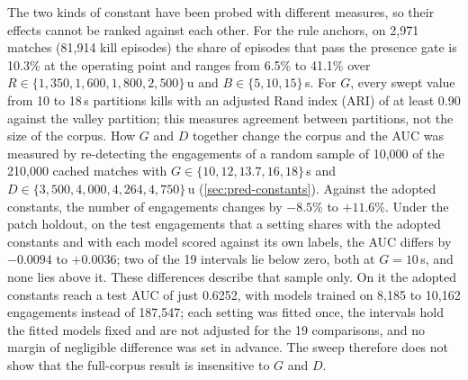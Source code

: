 The two kinds of constant have been probed with different measures, so their effects cannot be
ranked against each other. For the rule anchors, on 2,971 matches (81,914 kill episodes) the share
of episodes that pass the presence gate is 10.3\% at the operating point and ranges from 6.5\% to
41.1\% over $R \in \{1{,}350, 1{,}600, 1{,}800, 2{,}500\}$\,u and $B \in \{5, 10, 15\}$\,s.
For $G$, every swept value from 10 to 18\,s partitions kills with an adjusted Rand index (ARI) of at
least 0.90 against the valley partition; this measures agreement between partitions, not the size of
the corpus.
How $G$ and $D$ together change the corpus and the AUC was measured by re-detecting the engagements of a
random sample of 10,000 of the 210,000 cached matches with $G \in \{10, 12, 13.7, 16, 18\}$\,s and
$D \in \{3{,}500, 4{,}000, 4{,}264, 4{,}750\}$\,u (\cref{sec:pred-constants}). Against the adopted
constants, the number of engagements changes by $-8.5$\% to $+11.6$\%. Under the patch holdout, on the
test engagements that a setting shares with the adopted constants and with each model scored against its
own labels, the AUC differs by $-0.0094$ to $+0.0036$; two of the 19 intervals lie below zero, both at
$G = 10$\,s, and none lies above it. These differences describe that sample only. On it the adopted
constants reach a test AUC of just 0.6252, with models trained on 8,185 to 10,162 engagements instead of
187,547; each setting was fitted once, the intervals hold the fitted models fixed and are not adjusted for
the 19 comparisons, and no margin of negligible difference was set in advance. The sweep therefore does
not show that the full-corpus result is insensitive to $G$ and $D$.

